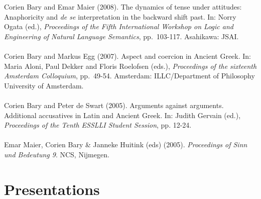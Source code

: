 \documentclass[a4paper,11pt]{article}
\begin{document}
Corien Bary and Emar Maier (2008). The dynamics of tense under attitudes: Anaphoricity and \emph{de se} interpretation in the backward shift past. In: Norry Ogata (ed.), \emph{Proceedings of the Fifth International Workshop on Logic and Engineering of Natural Language Semantics}, pp.\ 103-117. Asahikawa: JSAI.\\\\
Corien Bary and Markus Egg (2007). Aspect and coercion in Ancient Greek. In: Maria Aloni, Paul Dekker and Floris 
Roelofsen (eds.), \emph{Proceedings of the sixteenth Amsterdam Colloquium}, pp.\ 49-54.  Amsterdam: ILLC/Department of Philosophy 
University of Amsterdam.\\\\
Corien Bary and Peter de Swart (2005). Arguments against
arguments. Additional accusatives in Latin and Ancient Greek. In:
Judith Gervain (ed.), \emph{Proceedings of the Tenth ESSLLI
Student
Session}, pp. 12-24.\\\\
Emar Maier, Corien Bary \& Janneke Huitink (eds) (2005).
\emph{Proceedings of Sinn und Bedeutung 9}. NCS, Nijmegen.\\


\section*{Presentations}
\end{document}
